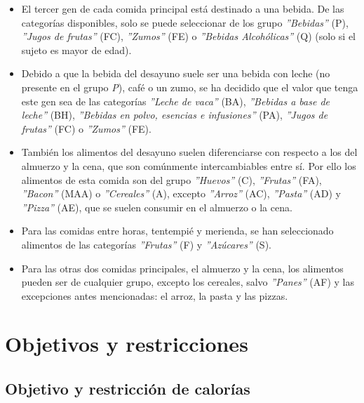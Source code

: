 \begin{itemize}
    \item El tercer gen de cada comida principal está destinado a una bebida. De las categorías disponibles, solo se puede seleccionar de los grupo \textit{''Bebidas''} (P), \textit{''Jugos de frutas''} (FC), \textit{''Zumos''} (FE) o \textit{''Bebidas Alcohólicas''} (Q) (solo si el sujeto es mayor de edad).
    \item Debido a que la bebida del desayuno suele ser una bebida con leche (no presente en el grupo \textit{P}), café o un zumo, se ha decidido que el valor que tenga este gen sea de las categorías \textit{''Leche de vaca''} (BA), \textit{''Bebidas a base de leche''} (BH), \textit{''Bebidas en polvo, esencias e infusiones''} (PA), \textit{''Jugos de frutas''} (FC) o \textit{''Zumos''} (FE).
    \item También los alimentos del desayuno suelen diferenciarse con respecto a los del almuerzo y la cena, que son comúnmente intercambiables entre sí. Por ello los alimentos de esta comida son del grupo \textit{''Huevos''} (C), \textit{''Frutas''} (FA), \textit{''Bacon''} (MAA) o \textit{''Cereales''} (A), excepto \textit{''Arroz''} (AC), \textit{''Pasta''} (AD) y \textit{''Pizza''} (AE), que se suelen consumir en el almuerzo o la cena.
    \item Para las comidas entre horas, tentempié y merienda, se han seleccionado alimentos de las categorías \textit{''Frutas''} (F) y \textit{''Azúcares''} (S).
    \item Para las otras dos comidas principales, el almuerzo y la cena, los alimentos pueden ser de cualquier grupo, excepto los cereales, salvo \textit{''Panes''} (AF) y las excepciones antes mencionadas: el arroz, la pasta y las pizzas.
\end{itemize}


\section{Objetivos y restricciones}
\label{ch:objetivo-restricciones}

\subsection{Objetivo y restricción de calorías}
\label{ch:objetivo-restriccion-calorias}

